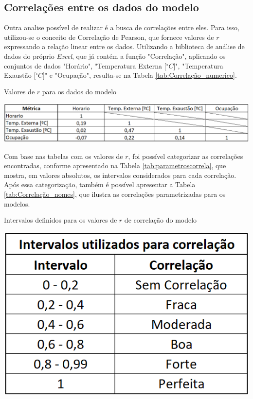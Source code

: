 \documentclass[acronym,symbols,table]{fei}
\begin{document}
\newpage

\subsection{Correlações entre os dados do modelo}

Outra analise possível de realizar é a busca de correlações entre eles. Para isso, utilizou-se o conceito de Correlação de Pearson, que fornece valores de $r$ expressando a relação linear entre os dados. Utilizando a biblioteca de análise de dados do próprio \textit{Excel}, que já contém a função "Correlação", aplicando os conjuntos de dados "Horário", "Temperatura Externa [$^\circ C$]", "Temperatura Exaustão [$^\circ C$]" e "Ocupação", resulta-se na Tabela \ref{tab:Correlação_numerico}.

\begin{table}[!htb]
 \centering
    \caption{Valores de $r$ para os dados do modelo}
    \includegraphics[width=1\linewidth]{Tabelas/Correlacao_numerico.png}
    \label{tab:Correlação_numerico}
\end{table}
\newpage
Com base nas tabelas com os valores de $r$, foi possível categorizar as correlações encontradas, conforme apresentado na Tabela \ref{tab:parametroscorrela}, que mostra, em valores absolutos, os intervalos considerados para cada correlação. Após essa categorização, também é possível apresentar a Tabela \ref{tab:Correlação_nomes}, que ilustra as correlações parametrizadas para os modelos.

\begin{table}[!htb]
 \centering
    \caption{Intervalos definidos para os valores de $r$ de correlação do modelo}
    \includegraphics[width=0.5\linewidth]{Tabelas/parametroscorrela.png}
    \label{tab:parametroscorrela}
\end{table}
\end{document}
